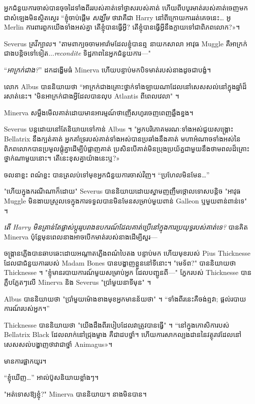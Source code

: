 អ្នកជំនួយការចាស់បានចុចដៃទាំងពីររបស់គាត់ទៅថ្ងាសរបស់គាត់ ហើយពីបបូរមាត់របស់គាត់ចេញមកជាសំឡេងមិនស្ថិតស្ថេរ “ខ្ញុំចាប់ផ្តើម \emph{សង្ឃឹម} ថាវាគឺជា Harry នៅពីក្រោយការរត់គេចនេះ… អូ Merlin ការពារពួកយើងទាំងអស់គ្នា តើខ្ញុំបានធ្វើអ្វី? តើ​ខ្ញុំ​បាន​ធ្វើ​អ្វី​នឹង​ក្លាយ​ទៅ​ជា​ពិភព​លោក?»។

Severus គ្រវីក្បាល។ "តាមពាក្យចចាមអារ៉ាមដែលខ្ញុំបានឮ នាយកសាលា អាវុធ Muggle គឺអាក្រក់ជាងបន្តិចទៅទៀត...\emph{recondite} ទិដ្ឋភាពនៃអ្នកជំនួយការ—"

“\emph{អាក្រក់ជាង?}” ដកដង្ហើមធំ Minerva ហើយបន្ទាប់មកបិទមាត់របស់នាងដូចជាបង្ខំ។

លោក Albus បាននិយាយថា “អាក្រក់ជាងគ្រោះថ្នាក់ទាំងឡាយណាដែលនៅសេសសល់នៅក្នុងឆ្នាំដ៏រសាត់នេះ។ "មិនអាក្រក់ជាងអ្វីដែលបានលុប Atlantis ពីពេលវេលា" ។

Minerva សម្លឹងមើលគាត់ដោយមានអារម្មណ៍ថាញើសហូរចេញពេញឆ្អឹងខ្នង។

Severus បន្តដោយនៅតែនិយាយទៅកាន់ Albus ។ "អ្នកបរិភោគមរណៈទាំងអស់ជួយសង្គ្រោះ Bellatrix នឹងក្បត់គាត់ អ្នកគាំទ្ររបស់គាត់ទាំងអស់បានប្រឆាំងនឹងគាត់ មហាអំណាចទាំងអស់នៃពិភពលោកបានប្រមូលផ្តុំគ្នាដើម្បីបំផ្លាញគាត់ ប្រសិនបើគាត់មិនប្រុងប្រយ័ត្នជាមួយនឹងថាមពលដ៏គ្រោះថ្នាក់ណាមួយនោះ។ តើ​នេះ​ខុស​គ្នា​យ៉ាង​នេះ​ឬ?»

ចលនាខ្លះ ពណ៌ខ្លះ បានត្រលប់ទៅមុខអ្នកជំនួយការចាស់វិញ។ “ប្រហែលមិនមែន…”

"ហើយក្នុងករណីណាក៏ដោយ" Severus បាននិយាយដោយស្នាមញញឹមថ្កោលទោសបន្តិច "អាវុធ Muggle មិនងាយស្រួលទេក្នុងការទទួលបានមិនមែនសម្រាប់មួយពាន់ Galleon ឬមួយពាន់ពាន់ទេ" ។

\emph{តើ Harry មិនគ្រាន់តែផ្លាស់ប្តូររូបរាងឧបករណ៍ដែលគាត់ប្រើនៅក្នុងការប្រយុទ្ធរបស់គាត់ទេ?} បានគិត Minerva ប៉ុន្តែមុនពេលនាងអាចបើកមាត់របស់នាងដើម្បីសួរ—

ចង្ក្រានភ្លើងបានឆាបឆេះដោយអណ្តាតភ្លើងពណ៌បៃតង បន្ទាប់មក ហើយមុខរបស់ Pius Thicknesse ដែលជាជំនួយការរបស់ Madam Bones បានបង្ហាញខ្លួននៅទីនោះ។ "មេទ័ព?" បាននិយាយថា Thicknesse ។ "ខ្ញុំមានរបាយការណ៍មួយសម្រាប់អ្នក ដែលបញ្ជូនពី—" ភ្នែករបស់ Thicknesse បានភ្លឹបភ្លែតៗលើ Minerva និង Severus "ប្រាំមួយនាទីមុន" ។

Albus បាននិយាយថា "ប្រាំមួយម៉ោងខាងមុខអ្នកមានន័យថា" ។ “ទាំងពីរនេះគឺចង់ឮវា; ផ្តល់របាយការណ៍របស់អ្នក។”

Thicknesse បាននិយាយថា "យើងដឹងពីរបៀបដែលវាត្រូវបានធ្វើ" ។ “នៅក្នុងកោសិការបស់ Bellatrix Black ដែលលាក់នៅជ្រុងម្ខាង គឺជាដបថ្នាំ។ ហើយ​ការ​សាកល្បង​ដាន​នៃ​វត្ថុ​រាវ​ដែល​នៅ​សេសសល់​បង្ហាញ​ថា​វា​ជា​ថ្នាំ Animagus»។

មានការផ្អាកយូរ។

“ខ្ញុំឃើញ…” អាល់ប៊ូសនិយាយខ្លាំងៗ។

"អត់ទោសឱ្យខ្ញុំ?" Minerva បាននិយាយ។ នាងមិនបាន។

